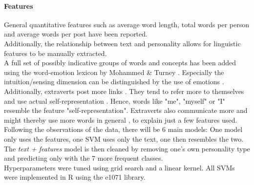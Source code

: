 \paragraph{Features} General quantitative features such as average word length, total words per person and average words per post have been reported.\\
Additionally, the relationship between text and personality allows for linguistic features to be manually extracted.\\
A full set of possibly indicative groups of words and concepts has been added using the word-emotion lexicon by Mohammed \& Turney \cite{mohammad_emotions_2010}. Especially the intuition/sensing dimension can be distinguished by the use of emotions \cite{gjurkovic_reddit:_2018}. Additionally, extraverts post more links \cite{blackwell_extraversion_2017}. They tend to refer more to themselves and use actual self-representation \cite{seidman_self-presentation_2013}. Hence, words like "me", "myself" or "I" resemble the feature "self-representation". Extraverts also communicate more and might thereby use more words in general \cite{seidman_self-presentation_2013}, to explain just a few features used.\\
Following the observations of the data, there will be 6 main models:
One model only uses the features, one SVM uses only the text, one then resembles the two. The \textit{text + features} model is then cleaned by removing one's own personality type and predicting only with the 7 more frequent classes.\\ Hyperparameters were tuned using grid search and a linear kernel. All SVMs were implemented in R using the e1071 library.